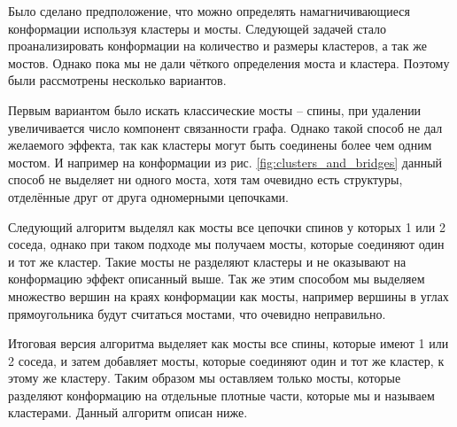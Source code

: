Было сделано предположение, что можно определять намагничивающиеся конформации используя кластеры и мосты. Следующей задачей стало проанализировать конформации на количество и размеры кластеров, а так же мостов. Однако пока мы не дали чёткого определения моста и кластера. Поэтому были рассмотрены несколько вариантов.

Первым вариантом было искать классические мосты -- спины, при удалении увеличивается число компонент связанности графа. Однако такой способ не дал желаемого эффекта, так как кластеры могут быть соединены более чем одним мостом. И например на конформации из рис. \ref{fig:clusters_and_bridges} данный способ не выделяет ни одного моста, хотя там очевидно есть структуры, отделённые друг от друга одномерными цепочками. 

Следующий алгоритм выделял как мосты все цепочки спинов у которых 1 или 2 соседа, однако при таком подходе мы получаем мосты, которые соединяют один и тот же кластер. Такие мосты не разделяют кластеры и не оказывают на конформацию эффект описанный выше. Так же этим способом мы выделяем множество вершин на краях конформации как мосты, например вершины в углах прямоугольника будут считаться мостами, что очевидно неправильно.

Итоговая версия алгоритма выделяет как мосты все спины, которые имеют 1 или 2 соседа, и затем добавляет мосты, которые соединяют один и тот же кластер, к этому же кластеру. Таким образом мы оставляем только мосты, которые разделяют конформацию на отдельные плотные части, которые мы и называем кластерами. Данный алгоритм описан ниже.

